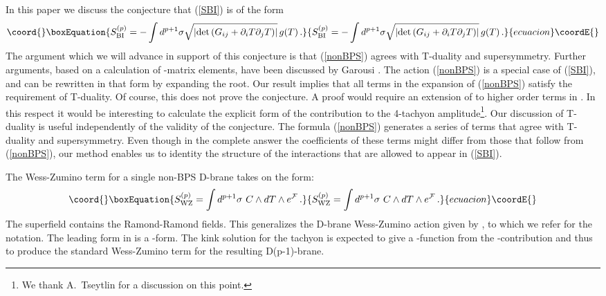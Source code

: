 \documentclass[12pt,a4paper]{article}
\begin{document}
 In this paper we discuss the conjecture  that (\ref{SBI})
  is of the form
 \begin{equation}\coord{}\boxEquation{
 \label{nonBPS}
    S_{\rm BI}^{(p)} =  -\int d^{p+1}\sigma \sqrt{ |{\rm det}\, ({G}_{ij} +
      \partial_iT\partial_jT)|}\,g(T)\,.
 }{
 S_{\rm BI}^{(p)} =  -\int d^{p+1}\sigma \sqrt{ |{\rm det}\, ({G}_{ij} +
      \partial_iT\partial_jT)|}\,g(T)\,.
 }{ecuacion}\coordE{}\end{equation}
 The argument which we will advance in support of this conjecture is that
  (\ref{nonBPS}) agrees with T-duality and supersymmetry. Further arguments,
  based on a calculation of \coordHE{}-matrix elements, have been discussed
  by Garousi \cite{Gar}. The action (\ref{nonBPS}) is a special case
  of (\ref{SBI}), and can be rewritten in that form by expanding the
  root. Our result implies that all terms in the expansion
  of (\ref{nonBPS})
  satisfy the requirement of T-duality.
  Of course, this does not prove the conjecture.
  A proof would require an extension of \cite{Gar} to higher order terms
  in \coordHE{}. In this respect it would be interesting to calculate
  the explicit form of the \coordHE{} contribution to the
  4-tachyon amplitude\footnote{We
  thank A.~Tseytlin for a discussion on this point.}.
  Our discussion of T-duality is useful independently of
  the validity of the conjecture. The formula (\ref{nonBPS}) generates a
  series of terms that agree with T-duality and supersymmetry. Even though
  in the complete answer the coefficients of these terms might differ from
  those that follow from (\ref{nonBPS}), our method enables us to identity
  the structure of the interactions that are allowed to appear in
  (\ref{SBI}).


The Wess-Zumino term for a single non-BPS D-brane
 takes on the form:
\begin{equation}\coord{}\boxEquation{
\label{SWZ}
   S^{(p)}_{\rm WZ} = \int d^{p+1}\sigma\,\, C\wedge dT\wedge e^{\cal F}\,.
}{
S^{(p)}_{\rm WZ} = \int d^{p+1}\sigma\,\, C\wedge dT\wedge e^{\cal F}\,.
}{ecuacion}\coordE{}\end{equation}
The superfield \coordHE{} contains the Ramond-Ramond fields.
 This generalizes the D-brane Wess-Zumino action given by \cite{GHT},
 to which we refer for the notation. The leading form in \coordHE{} is
 a \coordHE{}-form. The kink solution for the tachyon is expected to give a
 \myHighlight{$\delta$}\coordHE{}-function from the \coordHE{}-contribution and thus to produce the
 standard Wess-Zumino term for the resulting D(p-1)-brane.
\end{document}
